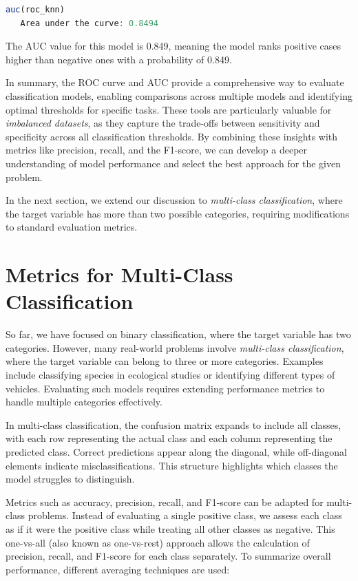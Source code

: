 \documentclass[
  11pt,
]{book}
\theoremstyle{definition}
\theoremstyle{definition}
\theoremstyle{definition}
\theoremstyle{definition}
\theoremstyle{remark}
\begin{document}
\begin{lstlisting}[language=R]
auc(roc_knn)
   Area under the curve: 0.8494
\end{lstlisting}

The AUC value for this model is 0.849, meaning the model ranks positive cases higher than negative ones with a probability of 0.849.

In summary, the ROC curve and AUC provide a comprehensive way to evaluate classification models, enabling comparisons across multiple models and identifying optimal thresholds for specific tasks. These tools are particularly valuable for \emph{imbalanced datasets}, as they capture the trade-offs between sensitivity and specificity across all classification thresholds. By combining these insights with metrics like precision, recall, and the F1-score, we can develop a deeper understanding of model performance and select the best approach for the given problem.

In the next section, we extend our discussion to \emph{multi-class classification}, where the target variable has more than two possible categories, requiring modifications to standard evaluation metrics.

\section{Metrics for Multi-Class Classification}\label{metrics-for-multi-class-classification}

So far, we have focused on binary classification, where the target variable has two categories. However, many real-world problems involve \emph{multi-class classification}, where the target variable can belong to three or more categories. Examples include classifying species in ecological studies or identifying different types of vehicles. Evaluating such models requires extending performance metrics to handle multiple categories effectively.

In multi-class classification, the confusion matrix expands to include all classes, with each row representing the actual class and each column representing the predicted class. Correct predictions appear along the diagonal, while off-diagonal elements indicate misclassifications. This structure highlights which classes the model struggles to distinguish.

Metrics such as accuracy, precision, recall, and F1-score can be adapted for multi-class problems. Instead of evaluating a single positive class, we assess each class as if it were the positive class while treating all other classes as negative. This one-vs-all (also known as one-vs-rest) approach allows the calculation of precision, recall, and F1-score for each class separately. To summarize overall performance, different averaging techniques are used:
\end{document}
